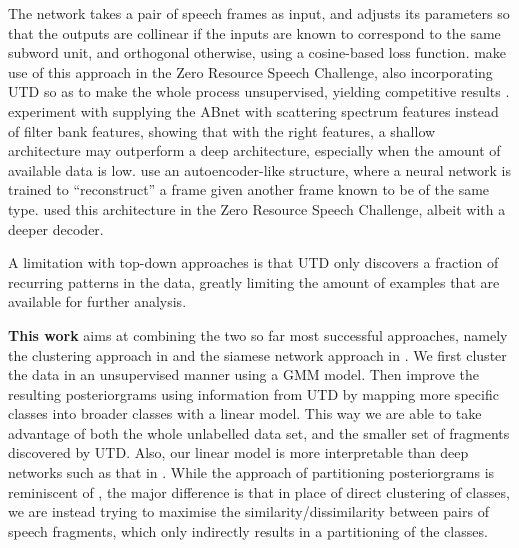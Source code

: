 The network takes a pair of speech frames as input, and adjusts its parameters so that the outputs are collinear if the inputs are known to correspond to the same subword unit, and orthogonal otherwise, using a cosine-based loss function.
\textcite{thiolliere2015hybrid} make use of this approach in the Zero Resource Speech Challenge, also incorporating UTD so as to make the whole process unsupervised, yielding competitive results \parencite{versteegh2016zero}.
\textcite{zeghidour2016deep} experiment with supplying the ABnet with scattering spectrum features instead of filter bank features, showing that with the right features, a shallow architecture may outperform a deep architecture, especially when the amount of available data is low.
\textcite{kamper2015unsupervised} use an autoencoder-like structure, where a neural network is trained to ``reconstruct'' a frame given another frame known to be of the same type.
\textcite{renshaw2015comparison} used this architecture in the Zero Resource Speech Challenge, albeit with a deeper decoder.

A limitation with top-down approaches is that UTD only discovers a fraction of recurring patterns in the data, greatly limiting the amount of examples that are available for further analysis.

\textbf{This work} %
aims at combining the two so far most successful approaches, namely the clustering approach in \parencite{chen2015parallel} and the siamese network approach in \parencite{thiolliere2015hybrid}.
We first cluster the data in an unsupervised manner using a GMM model.
Then improve the resulting posteriorgrams using information from UTD by mapping more specific classes into broader classes with a linear model.
This way we are able to take advantage of both the whole unlabelled data set, and the smaller set of fragments discovered by UTD.
Also, our linear model is more interpretable than deep networks such as that in \parencite{thiolliere2015hybrid}.
While the approach of partitioning posteriorgrams is reminiscent of \textcite{jansen2013weak}, the major difference is that in place of direct clustering of classes, we are instead trying to maximise the similarity/dissimilarity between pairs of speech fragments, which only indirectly results in a partitioning of the classes.

